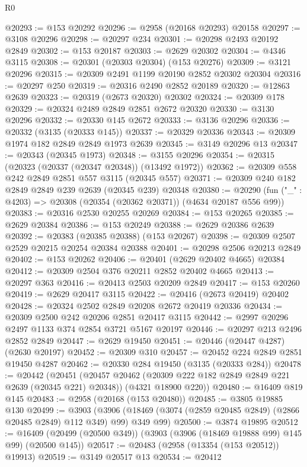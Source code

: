 \begin{lexlean}{R0}
\begin{coremodule}
@20293 := @153 @20292
@20296 := @2958 (@20168 @20293) @20158
@20297 := @3108 @20296
@20298 := @20297 @234
@20301 := @20298 @2493 @20192 @2849
@20302 := @153 @20187
@20303 := @2629 @20302
@20304 := @4346 @3115
@20308 := @20301 (@20303 @20304) (@153 @20276)
@20309 := @3121 @20296
@20315 := @20309 @2491 @1199 @20190 @2852 @20302 @20304
@20316 := @20297 @250
@20319 := @20316 @2490 @2852 @20189
@20320 := @12863 @2639
@20323 := @20319 (@2673 @20320) @20302
@20324 := @20309 @178
@20329 := @20324 @2489 @2849 @2851 @2672 @20320
@20330 := @3130 @20296
@20332 := @20330 @145 @2672
@20333 := @3136 @20296
@20336 := @20332 (@3135 (@20333 @145))
@20337 := @20329 @20336
@20343 := @20309 @1974 @182 @2849 @2849 @1973 @2639
@20345 := @3149 @20296 @13
@20347 := @20343 (@20345 @1973)
@20348 := @3155 @20296
@20354 := @20315 (@20323 (@20337 (@20347 @20348)) (@13492 @1972))
@20362 := @20309 @558 @242 @2849 @2851 @557 @3115 (@20345 @557)
@20371 := @20309 @240 @182 @2849 @2849 @239 @2639 (@20345 @239) @20348
@20380 := @20290 (fun ("_" : @4203) => @20308 (@20354 (@20362 @20371)) (@4634 @20187 @556 @99))
@20383 := @20316 @2530 @20255 @20269
@20384 := @153 @20265
@20385 := @2629 @20384
@20386 := @153 @20249
@20388 := @2629 @20386 @2639
@20392 := @20383 (@20385 @20388) (@153 @20267)
@20398 := @20309 @2507 @2529 @20215 @20254 @20384 @20388
@20401 := @20298 @2506 @20213 @2849
@20402 := @153 @20262
@20406 := @20401 (@2629 @20402 @4665) @20384
@20412 := @20309 @2504 @376 @20211 @2852 @20402 @4665
@20413 := @20297 @363
@20416 := @20413 @2503 @20209 @2849
@20417 := @153 @20260
@20419 := @2629 @20417 @3115
@20422 := @20416 (@2673 @20419) @20402
@20428 := @20324 @2502 @2849 @20208 @2672 @20419 @20336
@20434 := @20309 @2500 @242 @20206 @2851 @20417 @3115
@20442 := @2997 @20296 @2497 @1133 @374 @2854 @3721 @5167 @20197
@20446 := @20297 @213 @2496 @2852 @2849
@20447 := @2629 @19450
@20451 := @20446 (@20447 @4287) (@2630 @20197)
@20452 := @20309 @310
@20457 := @20452 @224 @2849 @2851 @19450 @4287
@20462 := @20330 @284 @19450 (@3135 (@20333 @284))
@20478 := @20442
    (@20451
      (@20457 @20462 (@20309 @222 @182 @2849 @2849 @221 @2639 (@20345 @221) @20348))
      (@4321 @18900 @220))
@20480 := @16409 @819 @145
@20483 := @2958 (@20168 (@153 @20480))
@20485 := @3805 @19885 @130
@20499 := @3903
    (@3906 (@18469 (@3074 (@2859 @20485 @2849) (@2866 @20485 @2849) @112 @349) @99) @349 @99)
@20500 := @3874 @19895
@20512 := @16409 (@20499 (@20500 @349)) (@3903 (@3906 (@18469 @19888 @99) @145 @99) (@20500 @145))
@20517 := @20483 (@2958 (@13354 (@153 @20512)) @19913)
@20519 := @3149 @20517 @13
@20534 := @20412

\end{coremodule}
\end{lexlean}
